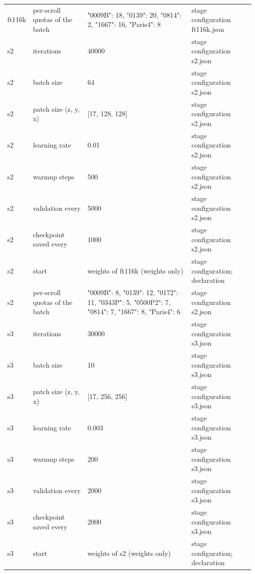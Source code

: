 {\begin{longtable}{@{}p{2.2cm}p{4.6cm}p{5.2cm}p{4.4cm}@{}}
ft116k & per-scroll quotas of the batch & {"0009B":\allowbreak{} 18,\allowbreak{} "0139":\allowbreak{} 20,\allowbreak{} "0814":\allowbreak{} 2,\allowbreak{} "1667":\allowbreak{} 16,\allowbreak{} "Paris4":\allowbreak{} 8} & stage configuration ft116k.\allowbreak{}json \\
s2 & iterations & 40000 & stage configuration s2.\allowbreak{}json \\
s2 & batch size & 64 & stage configuration s2.\allowbreak{}json \\
s2 & patch size (z,\allowbreak{} y,\allowbreak{} x) & [17, 128, 128] & stage configuration s2.\allowbreak{}json \\
s2 & learning rate & 0.01 & stage configuration s2.\allowbreak{}json \\
s2 & warmup steps & 500 & stage configuration s2.\allowbreak{}json \\
s2 & validation every & 5000 & stage configuration s2.\allowbreak{}json \\
s2 & checkpoint saved every & 1000 & stage configuration s2.\allowbreak{}json \\
s2 & start & weights of ft116k (weights only) & stage configuration; declaration \\
s2 & per-scroll quotas of the batch & {"0009B":\allowbreak{} 8,\allowbreak{} "0139":\allowbreak{} 12,\allowbreak{} "0172":\allowbreak{} 11,\allowbreak{} "0343P":\allowbreak{} 5,\allowbreak{} "0500P2":\allowbreak{} 7,\allowbreak{} "0814":\allowbreak{} 7,\allowbreak{} "1667":\allowbreak{} 8,\allowbreak{} "Paris4":\allowbreak{} 6} & stage configuration s2.\allowbreak{}json \\
s3 & iterations & 30000 & stage configuration s3.\allowbreak{}json \\
s3 & batch size & 10 & stage configuration s3.\allowbreak{}json \\
s3 & patch size (z,\allowbreak{} y,\allowbreak{} x) & [17, 256, 256] & stage configuration s3.\allowbreak{}json \\
s3 & learning rate & 0.003 & stage configuration s3.\allowbreak{}json \\
s3 & warmup steps & 200 & stage configuration s3.\allowbreak{}json \\
s3 & validation every & 2000 & stage configuration s3.\allowbreak{}json \\
s3 & checkpoint saved every & 2000 & stage configuration s3.\allowbreak{}json \\
s3 & start & weights of s2 (weights only) & stage configuration; declaration \\

\end{longtable}}

